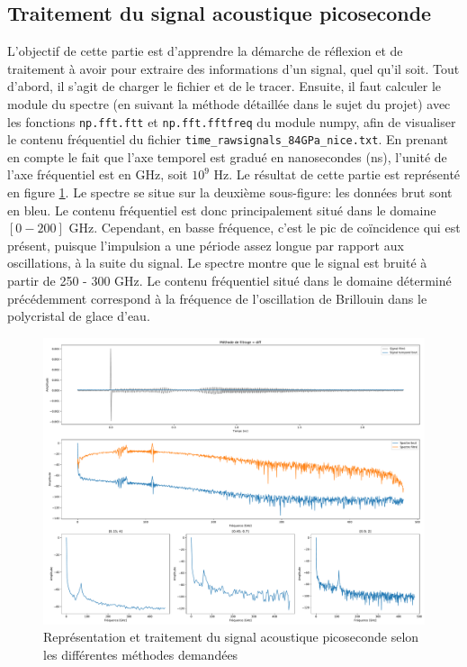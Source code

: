 \documentclass[a4paper,11pt]{article}
\begin{document}
\subsection{Traitement du signal acoustique picoseconde}
L'objectif de cette partie est d'apprendre la démarche de réflexion et de traitement à avoir pour extraire des informations d'un signal, quel qu'il soit. Tout d'abord, il s'agit de charger le fichier et de le tracer. Ensuite, il faut calculer le module du spectre (en suivant la méthode détaillée dans le sujet du projet) avec les fonctions \verb|np.fft.ftt| et \verb|np.fft.fftfreq| du module numpy, afin de visualiser le contenu fréquentiel du fichier \verb|time_rawsignals_84GPa_nice.txt|. En prenant en compte le fait que l'axe temporel est gradué en nanosecondes (ns), l'unité de l'axe fréquentiel est en GHz, soit $10^9$ Hz.
Le résultat de cette partie est représenté en figure \ref{fig:tds1}. Le spectre se situe sur la deuxième sous-figure: les données brut sont en bleu. Le contenu fréquentiel est donc principalement situé dans le domaine $[0 - 200]$ GHz. Cependant, en basse fréquence, c'est le pic de coïncidence qui est présent, puisque l'impulsion a une période assez longue par rapport aux oscillations, à la suite du signal. Le spectre montre que le signal est bruité à partir de 250 - 300 GHz. Le contenu fréquentiel situé dans le domaine déterminé précédemment correspond à la fréquence de l'oscillation de Brillouin dans le polycristal de glace d'eau.

\begin{figure}[H]
	\centering
	\includegraphics[width=\linewidth]{Figures/TDS1.pdf}
	\caption{Représentation et traitement du signal acoustique picoseconde selon les différentes méthodes demandées}
	\label{fig:tds1}
\end{figure}
\end{document}

